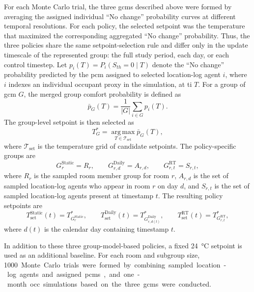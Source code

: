 For each Monte Carlo trial, the three \acp{gcm} described above were formed by averaging the assigned individual ``No change'' probability curves at different temporal resolutions.
For each policy, the selected setpoint was the temperature that maximized the corresponding aggregated ``No change'' probability.
Thus, the three policies share the same setpoint-selection rule and differ only in the update timescale of the represented group: the full study period, each day, or each control timestep.
Let $p_i(T)=P_i(S_{th}=0\mid T)$ denote the ``No change'' probability predicted by the \ac{pcm} assigned to selected location-log agent $i$, where $i$ indexes an individual occupant proxy in the simulation, at \acl{ti} $T$.
For a group of \ac{gcm} $G$, the merged group comfort probability is defined as
\begin{equation}
\bar{p}_{G}(T)
=
\frac{1}{|G|}
\sum_{i\in G} p_i(T).
\label{eq:gcm_probability_curve}
\end{equation}
The group-level setpoint is then selected as
\begin{equation}
T_G^{*}
=
\operatorname*{arg\,max}_{T\in\mathcal{T}_{\mathrm{set}}}
\bar{p}_{G}(T),
\label{eq:gcm_optimal_setpoint}
\end{equation}
where $\mathcal{T}_{\mathrm{set}}$ is the temperature grid of candidate setpoints.
The policy-specific groups are
\begin{equation}
G_{r}^{\mathrm{Static}} = R_r,
\qquad
G_{r,d}^{\mathrm{Daily}} = A_{r,d},
\qquad
G_{r,t}^{\mathrm{RT}} = S_{r,t},
\label{eq:policy_groups}
\end{equation}
where $R_r$ is the sampled room member group for room $r$, $A_{r,d}$ is the set of sampled location-log agents who appear in room $r$ on day $d$, and $S_{r,t}$ is the set of sampled location-log agents present at timestamp $t$.
The resulting policy setpoints are
\begin{equation}
T_{\mathrm{set}}^{\mathrm{Static}}(t)=T_{G_{r}^{\mathrm{Static}}}^{*},
\qquad
T_{\mathrm{set}}^{\mathrm{Daily}}(t)=T_{G_{r,d(t)}^{\mathrm{Daily}}}^{*},
\qquad
T_{\mathrm{set}}^{\mathrm{RT}}(t)=T_{G_{r,t}^{\mathrm{RT}}}^{*},
\label{eq:policy_setpoints}
\end{equation}
where $d(t)$ is the calendar day containing timestamp $t$.

In addition to these three group-model-based policies, a fixed \qty{24}{\celsius} setpoint is used as an additional baseline.
For each room and subgroup size, \qty{1000} Monte Carlo trials were formed by combining sampled location-log agents and assigned \acp{pcm}, and one-month \ac{occ} simulations based on the three \acp{gcm} were conducted.


